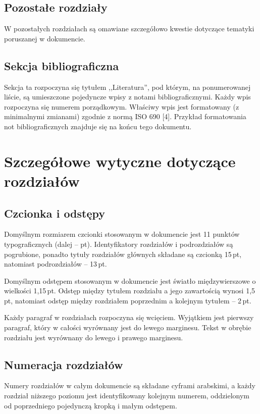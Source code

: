 \documentclass 	[11pt, a4paper, leqno]	{article}					%
\begin{document}
\subsection{Pozostałe rozdziały}
\noindent
W pozostałych rozdziałach są omawiane szczegółowo kwestie dotyczące tematyki poruszanej w dokumencie.

\subsection{Sekcja bibliograficzna}
\noindent
Sekcja ta rozpoczyna się tytułem ,,Literatura'', pod którym, na ponumerowanej liście, są umieszczone pojedyncze wpisy z notami bibliograficznymi.
Każdy wpis rozpoczyna się numerem porządkowym. Właściwy wpis jest formatowany (z minimalnymi zmianami) zgodnie z normą ISO 690 [4].
Przykład formatowania not bibliograficznych znajduje się na końcu tego dokumentu.

\section{Szczegółowe wytyczne dotyczące rozdziałów}

\subsection{Czcionka i odstępy}
\noindent
Domyślnym rozmiarem czcionki stosowanym w dokumencie jest 11 punktów typograficznych (dalej -- pt). Identyfikatory rozdziałów i podrozdziałów są pogrubione, ponadto tytuły rozdziałów głównych składane są czcionką 15\,pt, natomiast podrozdziałów -- 13\,pt.

Domyślnym odstępem stosowanym w dokumencie jest światło międzywierszowe o wielkości 1,15\,pt. Odstęp między tytułem rozdziału a jego zawartością wynosi 1,5\,pt, natomiast odstęp między rozdziałem poprzednim a kolejnym tytułem -- 2\,pt.
	
Każdy paragraf w rozdziałach rozpoczyna się wcięciem. Wyjątkiem jest pierwszy paragraf, który w całości wyrównany jest do lewego marginesu.  Tekst w obrębie rozdziału jest wyrównany do lewego i prawego marginesu.

\subsection{Numeracja rozdziałów}
\noindent
Numery rozdziałów w całym dokumencie są składane cyframi arabskimi, a każdy rozdział niższego poziomu jest identyfikowany kolejnym numerem, oddzielonym od poprzedniego pojedynczą kropką i małym odstępem. 
\end{document}
